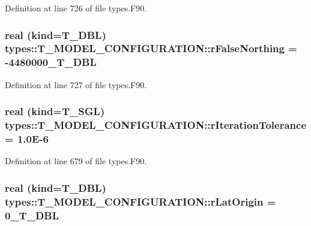Definition at line 726 of file types.F90.

\hypertarget{typetypes_1_1_t___m_o_d_e_l___c_o_n_f_i_g_u_r_a_t_i_o_n_a088e9de6ff8d8346074f3781debe6d80}{
\subsubsection[{rFalseNorthing}]{\setlength{\rightskip}{0pt plus 5cm}real (kind={\bf T\_\-DBL}) {\bf types::T\_\-MODEL\_\-CONFIGURATION::rFalseNorthing} = -\/4480000\_\-T\_\-DBL}}
\label{typetypes_1_1_t___m_o_d_e_l___c_o_n_f_i_g_u_r_a_t_i_o_n_a088e9de6ff8d8346074f3781debe6d80}


Definition at line 727 of file types.F90.

\hypertarget{typetypes_1_1_t___m_o_d_e_l___c_o_n_f_i_g_u_r_a_t_i_o_n_a24ed577563b666ba73bab0d5ca4ed90f}{
\subsubsection[{rIterationTolerance}]{\setlength{\rightskip}{0pt plus 5cm}real (kind={\bf T\_\-SGL}) {\bf types::T\_\-MODEL\_\-CONFIGURATION::rIterationTolerance} = 1.0E-\/6}}
\label{typetypes_1_1_t___m_o_d_e_l___c_o_n_f_i_g_u_r_a_t_i_o_n_a24ed577563b666ba73bab0d5ca4ed90f}


Definition at line 679 of file types.F90.

\hypertarget{typetypes_1_1_t___m_o_d_e_l___c_o_n_f_i_g_u_r_a_t_i_o_n_a1aad4b961ea490971d4180252dbeff6d}{
\subsubsection[{rLatOrigin}]{\setlength{\rightskip}{0pt plus 5cm}real (kind={\bf T\_\-DBL}) {\bf types::T\_\-MODEL\_\-CONFIGURATION::rLatOrigin} = 0\_\-T\_\-DBL}}
\label{typetypes_1_1_t___m_o_d_e_l___c_o_n_f_i_g_u_r_a_t_i_o_n_a1aad4b961ea490971d4180252dbeff6d}


